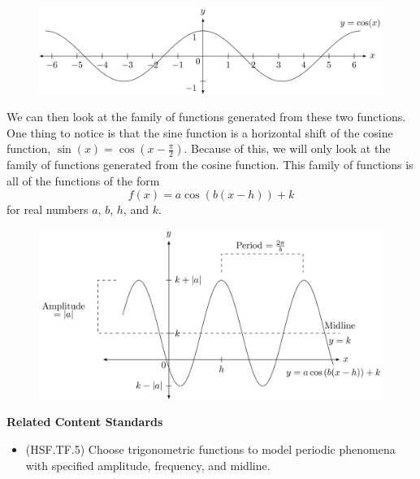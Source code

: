 \documentclass[
]{book}
\providecommand{\tightlist}{%
  \setlength{\itemsep}{0pt}\setlength{\parskip}{0pt}}
\newenvironment{standards}{}{}
\theoremstyle{definition}
\theoremstyle{definition}
\theoremstyle{definition}
\theoremstyle{definition}
\theoremstyle{remark}
\begin{document}
\begin{figure}

{\centering \includegraphics[width=1\linewidth]{tikz/cosine-graph} 

}

\end{figure}

We can then look at the family of functions generated from these two functions. One thing to notice is that the sine function is a horizontal shift of the cosine function, \(\sin(x)=\cos\left(x-\frac{\pi}{2}\right)\). Because of this, we will only look at the family of functions generated from the cosine function. This family of functions is all of the functions of the form
\[f(x)=a \cos\left(b(x-h)\right) +k\]
for real numbers \(a\), \(b\), \(h\), and \(k\).

\begin{figure}

{\centering \includegraphics[width=1\linewidth]{tikz/cosine-graph2} 

}

\end{figure}

\begin{standards}

\begin{center}
\textbf{Related Content Standards}

\end{center}

\begin{itemize}
\tightlist
\item
  (HSF.TF.5) Choose trigonometric functions to model periodic phenomena with specified amplitude, frequency, and midline.
\end{itemize}

\end{standards}
\end{document}
